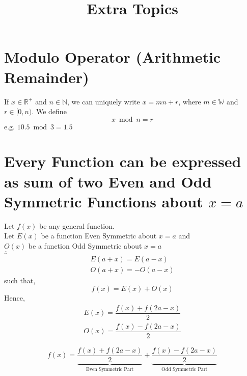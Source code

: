 \documentclass{article}
\title{Extra Topics}
\author{}
\date{}
\begin{document}
\maketitle

\section{Modulo Operator (Arithmetic Remainder)}
If $x \in \mathbb{R}^+$ and $n \in \mathbb{N}$, we can uniquely write $x=mn+r$, where $m \in \mathbb{W}$ and $r \in [0,n)$.
\newline
We define $$x \bmod n=r$$
\newline
e.g. $10.5 \bmod 3=1.5$
\section{Every Function can be expressed as sum of two Even and Odd Symmetric Functions about $x=a$}
Let $f(x)$ be any general function.\\
Let $E(x)$ be a function Even Symmetric about $x=a$ and\\ $O(x)$ be a function Odd Symmetric about $x=a$\\
$\therefore$
\begin{equation*}
    \begin{split}
    E(a+x)=E(a-x)\\
    O(a+x)=-O(a-x)
    \end{split}
\end{equation*}
such that, $$f(x)=E(x)+O(x)$$
Hence, 
\begin{equation*}
    \begin{split}
        E(x)=\dfrac{f(x)+f(2a-x)}{2}\\
        O(x)=\dfrac{f(x)-f(2a-x)}{2}  
    \end{split}
\end{equation*}

$$f(x)=\underbrace{\dfrac{f(x)+f(2a-x)}{2}}_{\text{Even Symmetric Part}}+\underbrace{\dfrac{f(x)-f(2a-x)}{2} }_{\text{Odd Symmetric Part}}$$
\end{document}
